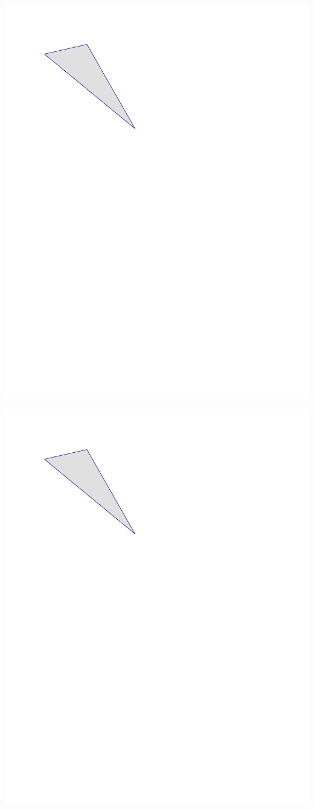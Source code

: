 \documentclass{ximera}
\begin{document}
\begin{problem}
\begin{image}
\includegraphics{./graphics/triangle.pdf}
\end{image}
\begin{image}
\includegraphics{./graphics/triangle.pdf}

\end{image}
\end{problem}
\end{document}
